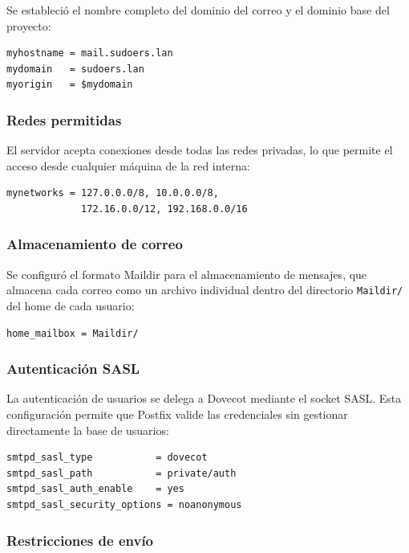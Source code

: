 Se estableció el nombre completo del dominio del correo y el dominio base del
proyecto:

\begin{lstlisting}[style=terminal]
myhostname = mail.sudoers.lan
mydomain   = sudoers.lan
myorigin   = $mydomain
\end{lstlisting}

\subsubsection{Redes permitidas}

El servidor acepta conexiones desde todas las redes privadas, lo que permite
el acceso desde cualquier máquina de la red interna:

\begin{lstlisting}[style=terminal]
mynetworks = 127.0.0.0/8, 10.0.0.0/8,
             172.16.0.0/12, 192.168.0.0/16
\end{lstlisting}

\subsubsection{Almacenamiento de correo}

Se configuró el formato Maildir para el almacenamiento de mensajes, que
almacena cada correo como un archivo individual dentro del directorio
\texttt{Maildir/} del home de cada usuario:

\begin{lstlisting}[style=terminal]
home_mailbox = Maildir/
\end{lstlisting}

\subsubsection{Autenticación SASL}

La autenticación de usuarios se delega a Dovecot mediante el socket SASL.
Esta configuración permite que Postfix valide las credenciales sin gestionar
directamente la base de usuarios:

\begin{lstlisting}[style=terminal]
smtpd_sasl_type           = dovecot
smtpd_sasl_path           = private/auth
smtpd_sasl_auth_enable    = yes
smtpd_sasl_security_options = noanonymous
\end{lstlisting}

\subsubsection{Restricciones de envío}

